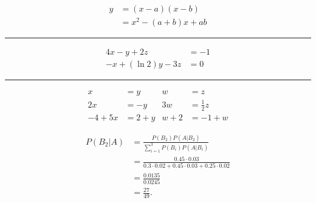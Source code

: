 \documentclass{article}
\begin{document}
\newpage


\lipsum[1][1-3]
\begin{align*} 
y	& = (x - a)(x - b) \\
	& = x^2 - (a + b)x + ab
\end{align*}
\lipsum[1][4-6]

\bigskip
\hrule
\bigskip

\lipsum[1][1-3]
\begin{align*}
4x - y + 2z		& = -1 \\
-x + (\ln 2)y - 3z	& = 0 %
\end{align*}
\lipsum[1][4-6]

\bigskip
\hrule
\bigskip

\lipsum[1][1-3]
\begin{align*}
x		& = y		&	w		& = z \\
2x		& = -y		&	3w		& = \frac{1}{2}z \\
-4 + 5x	& = 2 + y	&	w + 2	& = -1 + w       
\end{align*}
\lipsum[1][4-6]

\newpage


\lipsum[1][1-3]
\begingroup
{}
\setlength{\jot}{0.75 em} %
\begin{align*}
P(B_2|A)
	&= \frac{P(B_2)P(A|B_2)}{\sum_{i=1}^{3} P(B_i)P(A|B_i)} \\
	&= \frac{\num{0,45} \cdot \num{0,03}}{\num{0,3} \cdot \num{0,02} + \num{0,45} \cdot \num{0,03} + \num{0,25} \cdot \num{0,02}} \\
	&= \frac{\num{0,0135}}{\num{0,0245}} \\
	&= \frac{27}{49}.
\end{align*}
\endgroup
\lipsum[1][4-6]
\end{document}

